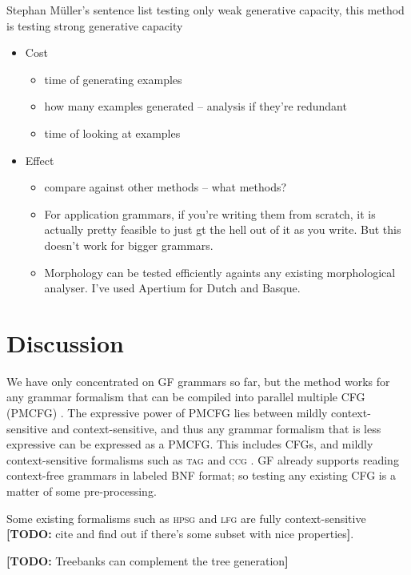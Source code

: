 \documentclass[11pt]{article}
\def\lfg{\textsc{lfg}}
\def\ccg{\textsc{ccg}}
\def\tag{\textsc{tag}}
\def\hpsg{\textsc{hpsg}}
\newcommand{\todo}[1]{{\color{cyan}\textbf{[TODO: }#1\textbf{]}}}
\begin{document}
Stephan Müller's sentence list testing only weak generative capacity,
this method is testing strong generative capacity


\begin{itemize}
\item Cost
  \begin{itemize}
  \item time of generating examples
  \item how many examples generated -- analysis if they're redundant
  \item time of looking at examples
  \end{itemize}

\item Effect
  \begin{itemize}
  \item compare against other methods -- what methods?
  \item For application grammars, if you're writing them from scratch, it is actually pretty feasible to just gt the hell out of it as you write. But this doesn't work for bigger grammars.
  \item Morphology can be tested efficiently againts any existing morphological analyser. I've used Apertium for Dutch and Basque.
  \end{itemize}
\end{itemize}


\section{Discussion}

We have only concentrated on GF grammars so far, but the method works
for any grammar formalism that can be compiled into parallel
multiple CFG (PMCFG) \cite{seki91pmcfg}. The expressive power of PMCFG lies
between mildly context-sensitive and context-sensitive, and thus any
grammar formalism that is less expressive can be expressed as a
PMCFG. This includes CFGs, and mildly context-sensitive formalisms
such as \tag{} \cite{joshi1975tag} and \ccg{} \cite{steedman1988ccg}. GF
already supports reading context-free grammars in labeled BNF format;
so testing any existing CFG is a matter of some pre-processing.

Some existing formalisms such as \hpsg{} and \lfg{} are fully
context-sensitive \todo{cite and find out if there's some subset with
  nice properties}.

\todo{Treebanks can complement the tree generation}
\end{document}
